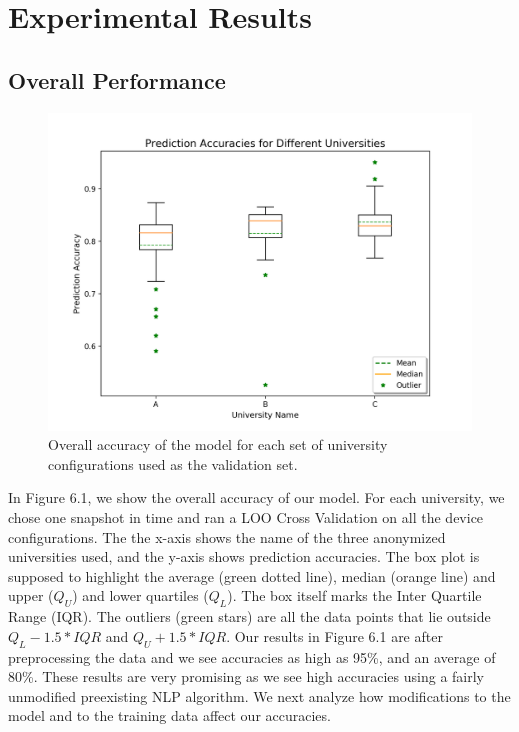 \documentclass[../thesis.tex]{subfiles}
\begin{document}
\chapter{Experimental Results}
\label{ch:results}

\section{Overall Performance}

 \begin{figure}[H]
	\centering
	\includegraphics[width=\textwidth]{uni_analysis.png}
	\caption{Overall accuracy of the model for each set of university configurations used as the validation set.}
\end{figure}

In Figure 6.1, we show the overall accuracy of our model. For each university, we chose one snapshot in time and ran a LOO Cross Validation on all the device configurations. The the x-axis shows the name of the three anonymized universities used, and the y-axis shows prediction accuracies. The box plot is supposed to highlight the average (green dotted line), median (orange line) and upper ($Q_U$) and lower quartiles ($Q_L$). The box itself marks the Inter Quartile Range (IQR). The outliers (green stars) are all the data points that lie outside $Q_L - 1.5*IQR$ and $Q_U+1.5*IQR$. Our results in Figure 6.1 are after preprocessing the data and we see accuracies as high as 95\%, and an average of 80\%. These results are very promising as we see high accuracies using a fairly unmodified preexisting NLP algorithm. We next analyze how modifications to the model and to the training data affect our accuracies.
\end{document}
